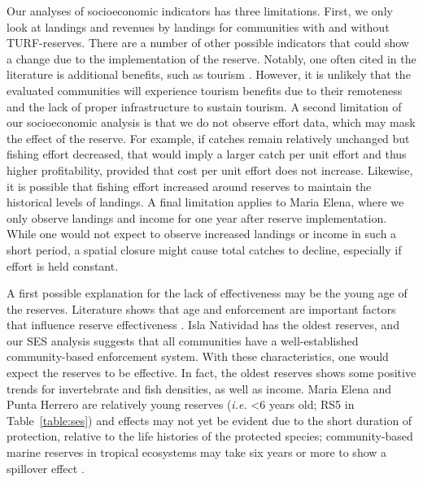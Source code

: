 \documentclass[10pt,letterpaper]{article}
\begin{document}
Our analyses of socioeconomic indicators has three limitations. First, we only look at landings and revenues by landings for communities with and without TURF-reserves. There are a number of other possible indicators that could show a change due to the implementation of the reserve. Notably, one often cited in the literature is additional benefits, such as tourism \cite{viana_2017}. However, it is unlikely that the evaluated communities will experience tourism benefits due to their remoteness and the lack of proper infrastructure to sustain tourism. A second limitation of our socioeconomic analysis is that we do not observe effort data, which may mask the effect of the reserve. For example, if catches remain relatively unchanged but fishing effort decreased, that would imply a larger catch per unit effort and thus higher profitability, provided that cost per unit effort does not increase. Likewise, it is possible that fishing effort increased around reserves to maintain the historical levels of landings. A final limitation applies to Maria Elena, where we only observe landings and income for one year after reserve implementation. While one would not expect to observe increased landings or income in such a short period, a spatial closure might cause total catches to decline, especially if effort is held constant.

A first possible explanation for the lack of effectiveness may be the young age of the reserves. Literature shows that age and enforcement are important factors that influence reserve effectiveness \cite{edgar_2014-UO,babcock_2010}. Isla Natividad has the oldest reserves, and our SES analysis suggests that all communities have a well-established community-based enforcement system. With these characteristics, one would expect the reserves to be effective. In fact, the oldest reserves shows some positive trends for invertebrate and fish densities, as well as income. Maria Elena and Punta Herrero are relatively young reserves (\emph{i.e.} \textless 6 years old; RS5 in Table~\ref{table:ses}) and effects may not yet be evident due to the short duration of protection, relative to the life histories of the protected species; community-based marine reserves in tropical ecosystems may take six years or more to show a spillover effect \cite{dasilva_2015-zX}. 
\end{document}
